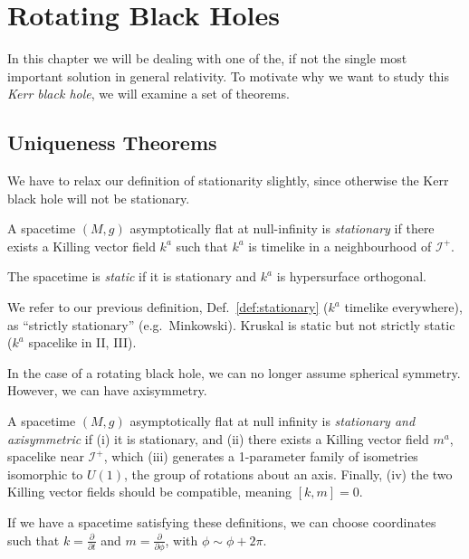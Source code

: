 
\chapter{Rotating Black Holes}%
\label{cha:rotating_black_holes}

In this chapter we will be dealing with one of the, if not the single most important solution in general relativity.
To motivate why we want to study this \emph{Kerr black hole}, we will examine a set of theorems.

\section{Uniqueness Theorems}%
\label{sec:uniqueness_theorems}

We have to relax our definition of stationarity slightly, since otherwise the Kerr black hole will not be stationary.
\begin{definition}[stationary]
  A spacetime $(M, g)$ asymptotically flat at null-infinity is \emph{stationary} if there exists a Killing vector field $k^{a}$ such that $k^{a}$ is timelike in a neighbourhood of $\mathscr{I}^+$.
\end{definition}
\begin{definition}[static]
  The spacetime is \emph{static} if it is stationary and $k^{a}$ is hypersurface orthogonal.
\end{definition}

We refer to our previous definition, Def.~\ref{def:stationary} ($k^{a}$ timelike everywhere), as ``strictly stationary'' (e.g.~Minkowski).
Kruskal is static but not strictly static ($k^{a}$ spacelike in II, III).

In the case of a rotating black hole, we can no longer assume spherical symmetry. However, we can have axisymmetry.
\begin{definition}
  A spacetime $(M, g)$ asymptotically flat at null infinity is \emph{stationary and axisymmetric} if (i) it is stationary, and (ii) there exists a Killing vector field $m^{a}$, spacelike near $\mathscr{I}^+$, which (iii) generates a 1-parameter family of isometries isomorphic to $U(1)$, the group of rotations about an axis.
  Finally, (iv) the two Killing vector fields should be compatible, meaning $[k, m] = 0$.
\end{definition}

If we have a spacetime satisfying these definitions, we can choose coordinates such that $k = \frac{\partial}{\partial t}$ and $m = \frac{\partial }{\partial \phi}$, with $\phi \sim \phi + 2 \pi$.

